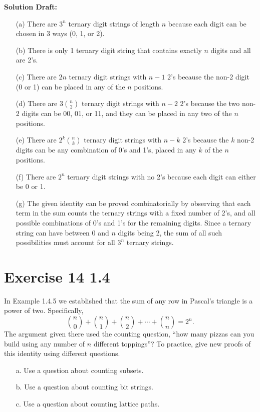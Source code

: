\documentclass{article}
\begin{document}
\vspace{0.5cm}
\noindent\textbf{Solution Draft:} 
\vspace{0.2cm}

\begin{enumerate}
    \item[(a)] There are \( 3^n \) ternary digit strings of length \( n \) because each digit can be chosen in 3 ways (0, 1, or 2).
    \item[(b)] There is only 1 ternary digit string that contains exactly \( n \) digits and all are 2's.
    \item[(c)] There are \( 2n \) ternary digit strings with \( n - 1 \) 2's because the non-2 digit (0 or 1) can be placed in any of the \( n \) positions.
    \item[(d)] There are \( 3 \binom{n}{2} \) ternary digit strings with \( n - 2 \) 2's because the two non-2 digits can be 00, 01, or 11, and they can be placed in any two of the \( n \) positions.
    \item[(e)] There are \( 2^k \binom{n}{k} \) ternary digit strings with \( n - k \) 2's because the \( k \) non-2 digits can be any combination of 0's and 1's, placed in any \( k \) of the \( n \) positions.
    \item[(f)] There are \( 2^n \) ternary digit strings with no 2's because each digit can either be 0 or 1.
    \item[(g)] The given identity can be proved combinatorially by observing that each term in the sum counts the ternary strings with a fixed number of 2's, and all possible combinations of 0's and 1's for the remaining digits. Since a ternary string can have between 0 and \( n \) digits being 2, the sum of all such possibilities must account for all \( 3^n \) ternary strings.
\end{enumerate}

\section*{Exercise 14 1.4}  

In Example 1.4.5 we established that the sum of any row in Pascal's triangle is a power of two. Specifically,
\[
\binom{n}{0} + \binom{n}{1} + \binom{n}{2} + \cdots + \binom{n}{n} = 2^n.
\]
The argument given there used the counting question, ``how many pizzas can you build using any number of \( n \) different toppings''? To practice, give new proofs of this identity using different questions.
\begin{enumerate}
    \item[a.] Use a question about counting subsets.
    \item[b.] Use a question about counting bit strings.
    \item[c.] Use a question about counting lattice paths.
\end{enumerate}
\end{document}
